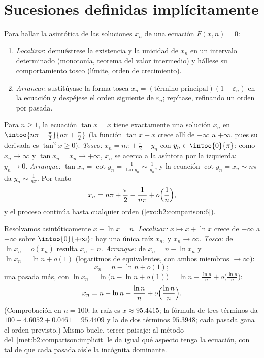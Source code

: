 \section{Sucesiones definidas implícitamente}

\begin{method}\label{met:b2:comparison:implicit}
Para hallar la asintótica de las soluciones $x_n$ de una ecuación
$F(x, n) = 0$:
\begin{enumerate}
  \item \emph{Localizar}: demuéstrese la existencia y la unicidad de
        $x_n$ en un intervalo determinado (monotonía, teorema del
        valor intermedio) y hállese su comportamiento tosco (límite,
        orden de crecimiento).
  \item \emph{Arrancar}: sustitúyase la forma tosca $x_n =
        (\text{término principal})(1 + \varepsilon_n)$ en la
        ecuación y despéjese el orden siguiente de $\varepsilon_n$;
        repítase, refinando un orden por pasada.
\end{enumerate}
\end{method}

\begin{example}\label{ex:b2:comparison:tan}
Para $n \geq 1$, la ecuación $\tan x = x$ tiene exactamente una
solución $x_n$ en $\intoo{n\pi - \frac\pi2}{n\pi + \frac\pi2}$ (la
función $\tan x - x$ crece allí de $-\infty$ a $+\infty$, pues su
derivada es $\tan^2 x \geq 0$). \emph{Tosco:} $x_n = n\pi +
\frac\pi2 - y_n$ con $y_n \in \intoo{0}{\pi}$; como $x_n \to \infty$
y $\tan x_n = x_n \to +\infty$, $x_n$ se acerca a la asíntota por la
izquierda: $y_n \to 0$. \emph{Arranque:} $\tan x_n = \cot y_n =
\frac{1}{\tan y_n} \sim \frac{1}{y_n}$, y la ecuación $\cot y_n =
x_n \sim n\pi$ da $y_n \sim \frac{1}{n\pi}$. Por tanto
\[
x_n = n\pi + \frac\pi2 - \frac{1}{n\pi} +
o\Bigl(\frac1n\Bigr),
\]
y el proceso continúa hasta cualquier orden
(\cref{exo:b2:comparison:6}).
\end{example}

\begin{example}\label{ex:b2:comparison:xplusln}
Resolvamos asintóticamente $x + \ln x = n$. \emph{Localizar:} $x
\mapsto x + \ln x$ crece de $-\infty$ a $+\infty$ sobre
$\intoo{0}{+\infty}$: hay una única raíz $x_n$, y $x_n \to \infty$.
\emph{Tosco:} de $\ln x_n = o(x_n)$ resulta $x_n \sim n$.
\emph{Arranque:} de $x_n = n - \ln x_n$ y $\ln x_n = \ln n + o(1)$
(logaritmos de equivalentes, con ambos miembros $\to \infty$):
\[
x_n = n - \ln n + o(1) ;
\]
una pasada más, con $\ln x_n = \ln\bigl(n - \ln n + o(1)\bigr) =
\ln n - \frac{\ln n}{n} + o\bigl(\frac{\ln n}n\bigr)$:
\[
x_n = n - \ln n + \frac{\ln n}{n} +
o\Bigl(\frac{\ln n}{n}\Bigr).
\]
(Comprobación en $n = 100$: la raíz es $x \approx 95.4415$; la
fórmula de tres términos da $100 - 4.6052 + 0.0461 = 95.4409$ y la
de dos términos $95.3948$; cada pasada gana el orden previsto.)
Mismo bucle, tercer paisaje: al método del~\cref{met:b2:comparison:implicit} le da igual qué aspecto tenga la
ecuación, con tal de que cada pasada aísle la incógnita dominante.
\end{example}

